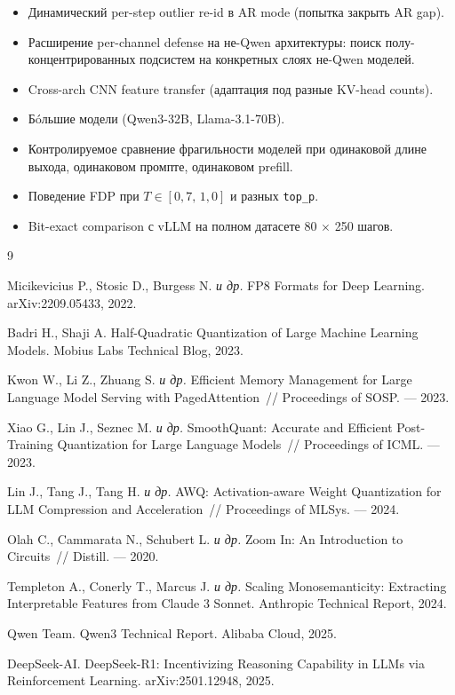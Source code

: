 \documentclass[a4paper,12pt]{article}
\begin{document}
\begin{itemize}[leftmargin=*]
\item Динамический per-step outlier re-id в AR mode (попытка закрыть AR
  gap).
\item Расширение per-channel defense на не-Qwen архитектуры: поиск
  полу-концентрированных подсистем на конкретных слоях не-Qwen моделей.
\item Cross-arch CNN feature transfer (адаптация под разные KV-head
  counts).
\item Бóльшие модели (Qwen3-32B, Llama-3.1-70B).
\item Контролируемое сравнение фрагильности моделей при одинаковой длине
  выхода, одинаковом промпте, одинаковом prefill.
\item Поведение FDP при $T \in [0{,}7,\,1{,}0]$ и разных
  \texttt{top\_p}.
\item Bit-exact comparison с vLLM на полном датасете 80 $\times$ 250
  шагов.
\end{itemize}

\renewcommand{\refname}{Список использованных источников}
\begin{thebibliography}{9}

Micikevicius P., Stosic D., Burgess N. \textit{и др.}
FP8 Formats for Deep Learning.
arXiv:2209.05433, 2022.

Badri H., Shaji A.
Half-Quadratic Quantization of Large Machine Learning Models.
Mobius Labs Technical Blog, 2023.

Kwon W., Li Z., Zhuang S. \textit{и др.}
Efficient Memory Management for Large Language Model Serving with
PagedAttention~// Proceedings of SOSP. --- 2023.

Xiao G., Lin J., Seznec M. \textit{и др.}
SmoothQuant: Accurate and Efficient Post-Training Quantization for
Large Language Models~// Proceedings of ICML. --- 2023.

Lin J., Tang J., Tang H. \textit{и др.}
AWQ: Activation-aware Weight Quantization for LLM Compression and
Acceleration~// Proceedings of MLSys. --- 2024.

Olah C., Cammarata N., Schubert L. \textit{и др.}
Zoom In: An Introduction to Circuits~// Distill. --- 2020.

Templeton A., Conerly T., Marcus J. \textit{и др.}
Scaling Monosemanticity: Extracting Interpretable Features from
Claude 3 Sonnet.
Anthropic Technical Report, 2024.

Qwen Team. Qwen3 Technical Report. Alibaba Cloud, 2025.

DeepSeek-AI.
DeepSeek-R1: Incentivizing Reasoning Capability in LLMs via
Reinforcement Learning. arXiv:2501.12948, 2025.

\end{thebibliography}
\end{document}
